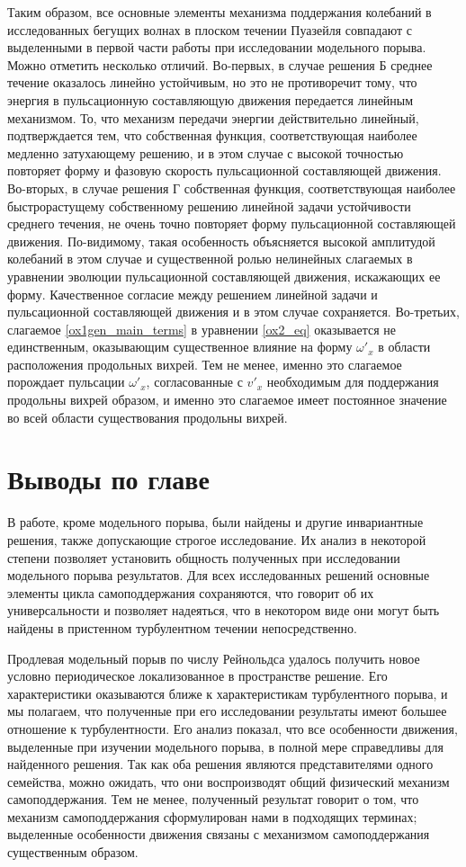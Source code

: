 Таким образом, все основные элементы механизма поддержания колебаний в исследованных бегущих волнах в плоском течении Пуазейля совпадают с выделенными в первой части работы при исследовании модельного порыва. Можно отметить несколько отличий. Во-первых, в случае решения Б среднее течение оказалось линейно устойчивым, но это не противоречит тому, что энергия в пульсационную составляющую движения передается линейным механизмом. То, что механизм передачи энергии действительно линейный, подтверждается тем, что собственная функция, соответствующая наиболее медленно затухающему решению, и в этом случае с высокой точностью повторяет форму и фазовую скорость пульсационной составляющей движения. Во-вторых, в случае решения Г собственная функция, соответствующая наиболее быстрорастущему собственному решению линейной задачи устойчивости среднего течения, не очень точно повторяет форму пульсационной составляющей движения. По-видимому, такая особенность объясняется высокой амплитудой колебаний в этом случае и существенной ролью нелинейных слагаемых в уравнении эволюции пульсационной составляющей движения, искажающих ее форму. Качественное согласие между решением линейной задачи и пульсационной составляющей движения и в этом случае сохраняется. Во-третьих, слагаемое \eqref{ox1gen_main_terms} в уравнении \eqref{ox2_eq} оказывается не единственным, оказывающим существенное влияние на форму $\omega'_x$ в области расположения продольных вихрей. Тем не менее, именно это слагаемое порождает пульсации $\omega'_x$, согласованные с $v'_x$ необходимым для поддержания продольны вихрей образом, и именно это слагаемое имеет постоянное значение во всей области существования продольны вихрей. 


\section{Выводы по главе}

В работе, кроме модельного порыва, были найдены и другие инвариантные решения, также допускающие строгое исследование. Их анализ в некоторой степени позволяет установить общность полученных при исследовании модельного порыва результатов. Для всех исследованных решений основные элементы цикла самоподдержания сохраняются, что говорит об их универсальности и позволяет надеяться, что в некотором виде они могут быть найдены в пристенном турбулентном течении непосредственно. 

Продлевая модельный порыв по числу Рейнольдса удалось получить новое условно периодическое локализованное в пространстве решение. Его характеристики оказываются ближе к характеристикам турбулентного порыва, и мы полагаем, что полученные при его исследовании результаты имеют большее отношение к турбулентности. Его анализ показал, что все особенности движения, выделенные при изучении модельного порыва, в полной мере справедливы для найденного решения. Так как оба решения являются представителями одного семейства, можно ожидать, что они воспроизводят общий физический механизм самоподдержания. Тем не менее, полученный результат говорит о том, что механизм самоподдержания сформулирован нами в подходящих терминах; выделенные особенности движения связаны с механизмом самоподдержания существенным образом. 


